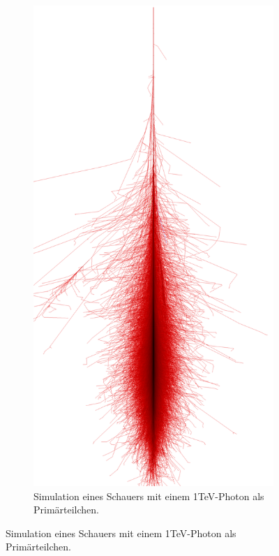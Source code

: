 \begin{figure}
 \begin{subfigure}{0.4\textwidth}
  \includegraphics[width=\textwidth]{./Plots/03_MonteCarlos/Photon_1TeV_CORSIKA.png}
  \caption{Simulation eines Schauers mit einem 1TeV-Photon als Primärteilchen.}

\end{subfigure}
\end{figure}
